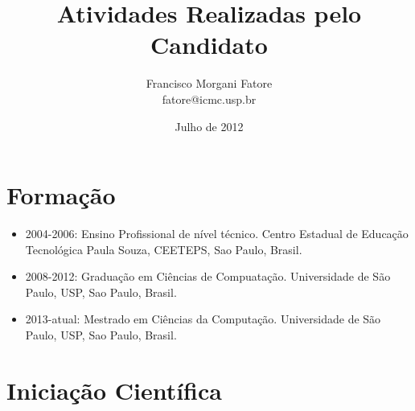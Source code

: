 \documentclass[12pt]{article}
\title{Atividades Realizadas pelo Candidato}
\author{Francisco Morgani Fatore\\fatore@icmc.usp.br}
\date{Julho de 2012}
\begin{document}
\maketitle

\section{Formação}

\begin{itemize}

    \item 2004-2006: Ensino Profissional de nível técnico. 
        Centro Estadual de Educação Tecnológica Paula Souza,
        CEETEPS, Sao Paulo, Brasil.

    \item 2008-2012: Graduação em Ciências de Compuatação. 
        Universidade de São Paulo, USP, Sao Paulo, Brasil.

    \item 2013-atual: Mestrado em Ciências da Computação. 
        Universidade de São Paulo, USP, Sao Paulo, Brasil.

\end{itemize}

\section{Iniciação Científica}
\end{document}
